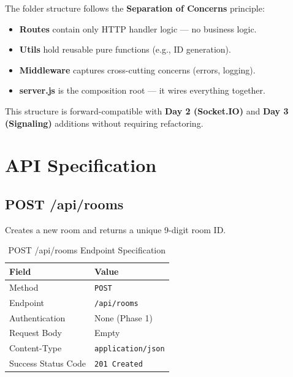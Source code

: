 \documentclass[11pt,a4paper]{article}
\begin{document}
The folder structure follows the \textbf{Separation of Concerns} principle:

\begin{itemize}
    \item \textbf{Routes} contain only HTTP handler logic --- no business logic.
    \item \textbf{Utils} hold reusable pure functions (e.g., ID generation).
    \item \textbf{Middleware} captures cross-cutting concerns (errors, logging).
    \item \textbf{server.js} is the composition root --- it wires everything together.
\end{itemize}

This structure is forward-compatible with \textbf{Day 2 (Socket.IO)} and \textbf{Day 3 (Signaling)} additions without requiring refactoring.

\section{API Specification}

\subsection{POST /api/rooms}

Creates a new room and returns a unique 9-digit room ID.

\begin{table}[h!]
\centering
\begin{tabular}{@{}ll@{}}
\toprule
\textbf{Field}          & \textbf{Value} \\ \midrule
Method                  & \texttt{POST} \\
Endpoint                & \texttt{/api/rooms} \\
Authentication          & None (Phase 1) \\
Request Body            & Empty \\
Content-Type            & \texttt{application/json} \\
Success Status Code     & \texttt{201 Created} \\ \bottomrule
\end{tabular}
\caption{POST /api/rooms Endpoint Specification}
\label{tab:post_rooms}
\end{table}
\end{document}

